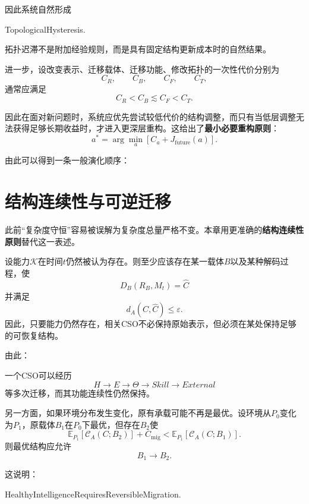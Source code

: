 因此系统自然形成
\begin{statementbox}
TopologicalHysteresis.
\end{statementbox}

拓扑迟滞不是附加经验规则，而是具有固定结构更新成本时的自然结果。

进一步，设改变表示、迁移载体、迁移功能、修改拓扑的一次性代价分别为
\[
C_R,
\qquad
C_B,
\qquad
C_F,
\qquad
C_T,
\]
通常应满足
\[
C_R
<
C_B
\lesssim
C_F
<
C_T.
\]

因此在面对新问题时，系统应优先尝试较低代价的结构调整，而只有当低层调整无法获得足够长期收益时，才进入更深层重构。这给出了\textbf{最小必要重构原则}：
\[
\boxed{
a^*
=
\arg\min_a
\left[
C_a
+
J_{\mathrm{future}}(a)
\right].
}
\]

由此可以得到一条一般演化顺序：
\begin{statementbox}
\centering
{}
\end{statementbox}

\section{结构连续性与可逆迁移}

此前“复杂度守恒”容易被误解为复杂度总量严格不变。本章用更准确的\textbf{结构连续性原则}替代这一表述。

设能力$\mathcal{K}$在时间$t$仍然被认为存在。则至少应该存在某一载体$B$以及某种解码过程，使
\[
D_B(R_B,M_t)
=
\hat C
\]
并满足
\[
d_A(C,\hat C)
\leq
\varepsilon.
\]
因此，只要能力仍然存在，相关CSO不必保持原始表示，但必须在某处保持足够的可恢复结构。

由此：
\begin{statementbox}
\centering
{}
\end{statementbox}

一个CSO可以经历
\[
H\rightarrow E\rightarrow\Theta\rightarrow Skill\rightarrow External
\]
等多次迁移，而其功能连续性仍然保持。

另一方面，如果环境分布发生变化，原有承载可能不再是最优。设环境从$P_0$变化为$P_1$，原载体$B_1$在$P_0$下最优，但存在$B_2$使
\[
\mathbb{E}_{P_1}
[
\mathscr C_A(C;B_2)
]
+
C_{\mathrm{mig}}
<
\mathbb{E}_{P_1}
[
\mathscr C_A(C;B_1)
].
\]
则最优结构应允许
\[
B_1\rightarrow B_2.
\]

这说明：
\begin{statementbox}
HealthyIntelligenceRequiresReversibleMigration.
\end{statementbox}

